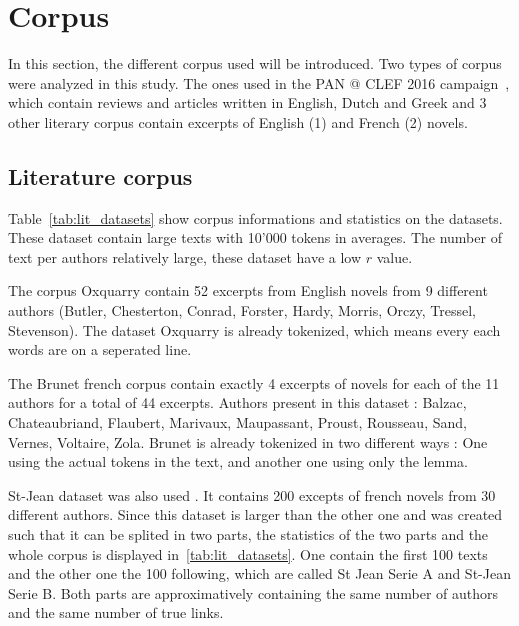\section{Corpus}

In this section, the different corpus used will be introduced.
Two types of corpus were analyzed in this study.
The ones used in the PAN @ CLEF 2016 campaign~\cite{pan16}, which contain reviews and articles written in English, Dutch and Greek and 3 other literary corpus contain excerpts of English (1) and French (2) novels.

\subsection{Literature corpus}
\label{sec:lit_corpus}

Table~\ref{tab:lit_datasets} show corpus informations and statistics on the datasets.
These dataset contain large texts with 10'000 tokens in averages.
The number of text per authors relatively large, these dataset have a low $r$ value.

The corpus Oxquarry contain 52 excerpts from English novels from 9 different authors (Butler, Chesterton, Conrad, Forster, Hardy, Morris, Orczy, Tressel, Stevenson).
The dataset Oxquarry is already tokenized, which means every each words are on a seperated line.

The Brunet french corpus contain exactly 4 excerpts of novels for each of the 11 authors for a total of 44 excerpts.
Authors present in this dataset : Balzac, Chateaubriand, Flaubert, Marivaux, Maupassant, Proust, Rousseau, Sand, Vernes, Voltaire, Zola.
Brunet is already tokenized in two different ways : One using the actual tokens in the text, and another one using only the lemma.

St-Jean dataset was also used \cite{unine_corpus}.
It contains 200 excepts of french novels from 30 different authors.
Since this dataset is larger than the other one and was created such that it can be splited in two parts, the statistics of the two parts and the whole corpus is displayed in~\ref{tab:lit_datasets}.
One contain the first 100 texts and the other one the 100 following, which are called St Jean Serie A and St-Jean Serie B.
Both parts are approximatively containing the same number of authors and the same number of true links.


